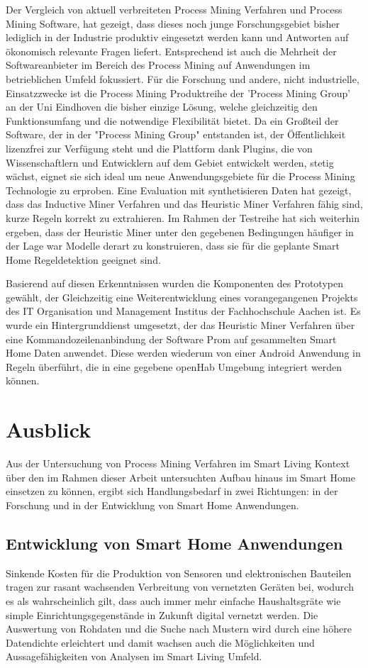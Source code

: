 Der Vergleich von aktuell verbreiteten Process Mining Verfahren und Process Mining Software, hat gezeigt, dass dieses noch junge Forschungsgebiet bisher lediglich in der Industrie produktiv eingesetzt werden kann und Antworten auf ökonomisch relevante Fragen liefert. Entsprechend ist auch die Mehrheit der  Softwareanbieter im Bereich des Process Mining auf Anwendungen im betrieblichen Umfeld fokussiert. 
Für die Forschung und andere, nicht industrielle, Einsatzzwecke ist die Process Mining Produktreihe der 'Process Mining Group' an der Uni Eindhoven die bisher einzige Lösung, welche gleichzeitig den Funktionsumfang und die notwendige Flexibilität bietet. Da ein Großteil der Software, der in der "Process Mining Group" entstanden ist, der Öffentlichkeit lizenzfrei zur Verfügung steht und die Plattform dank Plugins, die von Wissenschaftlern und Entwicklern auf dem Gebiet entwickelt werden, stetig wächst, eignet sie sich ideal um neue Anwendungsgebiete für die Process Mining Technologie zu erproben.
Eine Evaluation mit synthetisieren Daten hat gezeigt, dass das Inductive Miner Verfahren und das Heuristic Miner Verfahren fähig sind, kurze Regeln korrekt zu extrahieren. Im Rahmen der Testreihe hat sich weiterhin ergeben, dass der Heuristic Miner unter den gegebenen Bedingungen häufiger in der Lage war Modelle derart zu konstruieren, dass sie für die geplante Smart Home Regeldetektion geeignet sind.

Basierend auf diesen Erkenntnissen wurden die Komponenten des Prototypen gewählt, der Gleichzeitig eine Weiterentwicklung eines vorangegangenen Projekts des IT Organisation und Management Institus der Fachhochschule Aachen ist. Es wurde ein Hintergrunddienst umgesetzt, der das Heuristic Miner Verfahren über eine Kommandozeilenanbindung der Software Prom auf gesammelten Smart Home Daten anwendet. Diese werden wiederum von einer Android Anwendung in Regeln überführt, die in eine gegebene openHab Umgebung integriert werden können.
\newpage
\section{Ausblick}
Aus der Untersuchung von Process Mining Verfahren im Smart Living Kontext über den im Rahmen dieser Arbeit untersuchten Aufbau hinaus im Smart Home einsetzen zu können, ergibt sich Handlungsbedarf in zwei Richtungen: in der Forschung und in der Entwicklung von Smart Home Anwendungen.

\subsection{Entwicklung von Smart Home Anwendungen}
Sinkende Kosten für die Produktion von Sensoren und elektronischen Bauteilen tragen zur rasant wachsenden Verbreitung von vernetzten Geräten bei, wodurch es als wahrscheinlich gilt, dass auch immer mehr einfache Haushaltsgräte wie simple Einrichtungsgegenstände in Zukunft digital vernetzt werden. Die Auswertung von Rohdaten und die Suche nach Mustern wird durch eine höhere Datendichte erleichtert und damit wachsen auch die Möglichkeiten und Aussagefähigkeiten von Analysen im Smart Living Umfeld.

